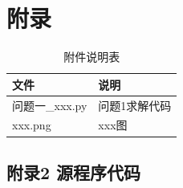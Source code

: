 
\makeatletter
\let\@oldaddcontentsline\addcontentsline
\renewcommand{\addcontentsline}[3]{}
\section*{附录}
\let\addcontentsline\@oldaddcontentsline
\makeatother

\begin{table}[H]
  \centering
  \caption{附件说明表}
  \label{tab:appendix}
  \renewcommand{\arraystretch}{1.2}
  \begin{tabularx}{\textwidth}{LX}
    \toprule
    文件 & 说明 \\
    \midrule
    问题一\_xxx.py & 问题1求解代码 \\
    xxx.png & xxx图 \\
    \bottomrule
  \end{tabularx}
\end{table}

\subsection*{附录2 源程序代码}


